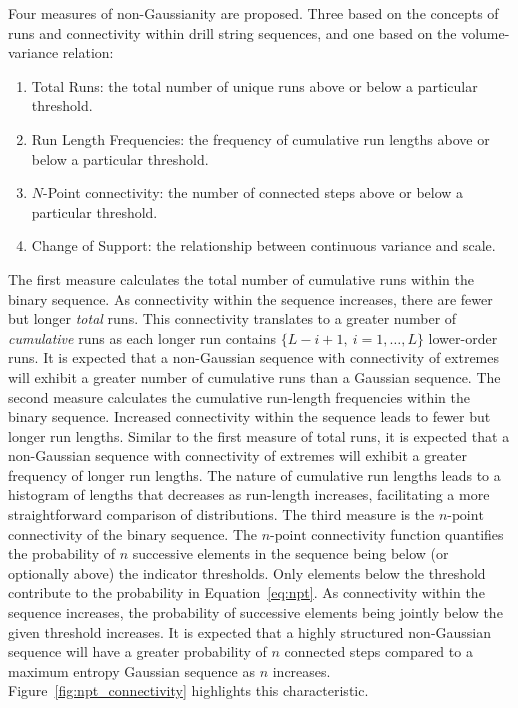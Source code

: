 Four measures of non-Gaussianity are proposed. Three based on the concepts of runs and connectivity within drill string sequences, and one based on the volume-variance relation:
\begin{enumerate}[noitemsep]
    \item Total Runs: the total number of unique runs above or below a particular threshold.
    \item Run Length Frequencies: the frequency of cumulative run lengths above or below a particular threshold.
    \item $N$-Point connectivity: the number of connected steps above or below a particular threshold.
    \item Change of Support: the relationship between continuous variance and scale.
\end{enumerate}

The first measure calculates the total number of cumulative runs within the binary sequence. As connectivity within the sequence increases, there are fewer but longer \emph{total} runs. This connectivity translates to a greater number of \emph{cumulative} runs as each longer run contains $\{L-i+1, \ i=1,\dots,L\}$ lower-order runs. It is expected that a non-Gaussian sequence with connectivity of extremes will exhibit a greater number of cumulative runs than a Gaussian sequence. The second measure calculates the cumulative run-length frequencies within the binary sequence. Increased connectivity within the sequence leads to fewer but longer run lengths. Similar to the first measure of total runs, it is expected that a non-Gaussian sequence with connectivity of extremes will exhibit a greater frequency of longer run lengths. The nature of cumulative run lengths leads to a histogram of lengths that decreases as run-length increases, facilitating a more straightforward comparison of distributions. The third measure is the $n\text{-point}$ connectivity of the binary sequence. The $n\text{-point}$ connectivity function quantifies the probability of $n$ successive elements in the sequence being below (or optionally above) the indicator thresholds. Only elements below the threshold contribute to the probability in Equation~\ref{eq:npt}. As connectivity within the sequence increases, the probability of successive elements being jointly below the given threshold increases. It is expected that a highly structured non-Gaussian sequence will have a greater probability of $n$ connected steps compared to a maximum entropy Gaussian sequence as $n$ increases. Figure~\ref{fig:npt_connectivity} highlights this characteristic.

